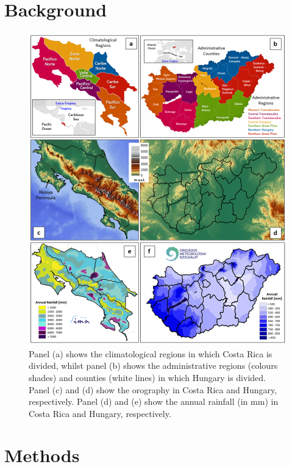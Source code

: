 \documentclass[twocol]{ametsocV5} %
\begin{document}
\section{Background}
\begin{figure}
\centerline{\includegraphics[width=39pc]{manuscript/Figures/Background_Location_Orography_AnnualRainfall_H_CR.png}}
\caption{Panel (a) shows the climatological regions in which Costa Rica is divided, whilst panel (b) shows the administrative regions (colours shades) and counties (white lines) in which Hungary is divided. Panel (c) and (d) show the orography in Costa Rica and Hungary, respectively. Panel (d) and (e) show the annual rainfall (in mm) in Costa Rica and Hungary, respectively.}
\label{Location_Annual_Rainfall_H_CR}
\end{figure}


\section{Methods} 
\end{document}
